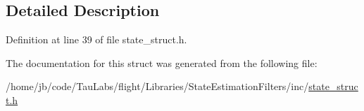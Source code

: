 \subsection{\-Detailed \-Description}


\-Definition at line 39 of file state\-\_\-struct.\-h.



\-The documentation for this struct was generated from the following file\-:\begin{DoxyCompactItemize}
\item 
/home/jb/code/\-Tau\-Labs/flight/\-Libraries/\-State\-Estimation\-Filters/inc/\hyperlink{state__struct_8h}{state\-\_\-struct.\-h}\end{DoxyCompactItemize}
